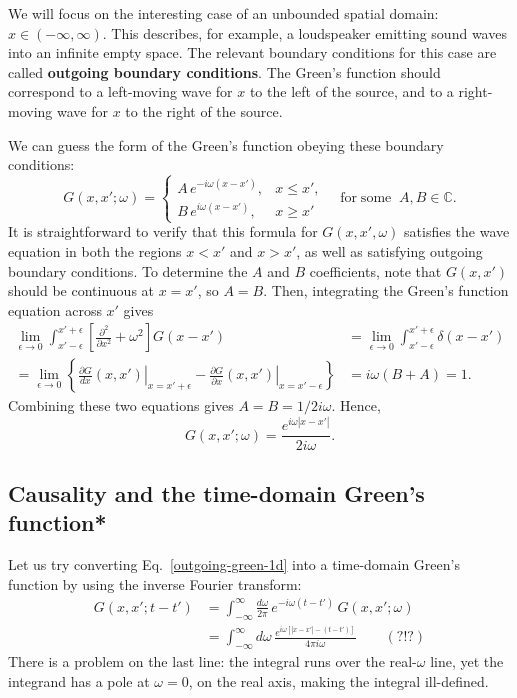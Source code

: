 \documentclass[10pt,a4paper]{article}
\begin{document}
We will focus on the interesting case of an unbounded spatial domain:
$x \in (-\infty, \infty)$. This describes, for example, a loudspeaker
emitting sound waves into an infinite empty space. The relevant
boundary conditions for this case are called \textbf{outgoing boundary
  conditions}. The Green's function should correspond to a left-moving
wave for $x$ to the left of the source, and to a right-moving wave for
$x$ to the right of the source.

We can guess the form of the Green's function obeying these boundary
conditions:
\begin{equation}
G(x,x';\omega) = \left\{\begin{array}{ll}A \, e^{-i\omega (x-x')}, & x \le x', \\ B \, e^{i\omega (x-x')}, & x \ge x'\end{array}\right. \quad \mathrm{for}\;\mathrm{some}\;\; A, B \in \mathbb{C}.
\end{equation}
It is straightforward to verify that this formula for $G(x,x',\omega)$
satisfies the wave equation in both the regions $x < x'$ and
$x > x'$, as well as satisfying outgoing boundary conditions. To
determine the $A$ and $B$ coefficients, note that $G(x,x')$ should
be continuous at $x = x'$, so $A = B$. Then, integrating the Green's
function equation across $x'$ gives
\begin{align}
  \lim_{\epsilon \rightarrow 0} \int_{x'-\epsilon}^{x'+\epsilon} \left[\frac{\partial^2}{\partial x^2} + \omega^2\right]G(x-x') &= \lim_{\epsilon \rightarrow 0} \int_{x'-\epsilon}^{x'+\epsilon} \delta(x-x') \\
  = \lim_{\epsilon \rightarrow 0} \left\{ \left.\frac{\partial G}{dx} (x,x') \right|_{x = x'+\epsilon} - \left.\frac{\partial G}{\partial x} (x,x') \right|_{x = x'-\epsilon}\right\} &= i\omega (B + A) = 1.
\end{align}
Combining these two equations gives $A = B = 1/2i\omega$. Hence,
\begin{equation}
G(x,x';\omega) = \frac{e^{i\omega |x-x'|}}{2i\omega}.
\label{outgoing-green-1d}
\end{equation}

\subsection{Causality and the time-domain Green's function*}
\label{causality-and-the-time-domain-greens-function}

Let us try converting Eq.~\eqref{outgoing-green-1d} into a time-domain
Green's function by using the inverse Fourier transform:
\begin{align}
  G(x,x';t-t')
  &= \int_{-\infty}^\infty \frac{d\omega}{2\pi} \, e^{-i\omega (t-t')} \, G(x,x'; \omega) \\
  &= \int_{-\infty}^\infty d\omega \, \frac{e^{i\omega \left[|x-x'| - (t-t')\right]}}{4\pi i\omega}\qquad (?!?) \nonumber
\end{align}
There is a problem on the last line: the integral runs over the
real-$\omega$ line, yet the integrand has a pole at $\omega = 0$, on
the real axis, making the integral ill-defined.
\end{document}
